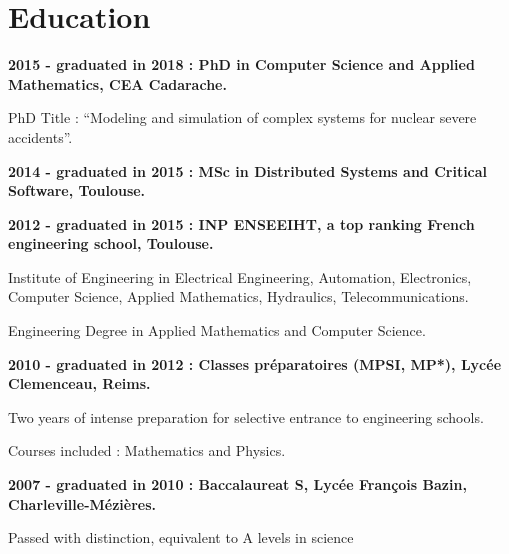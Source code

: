 \documentclass{article}
\renewenvironment{itemize}{
  \begin{list}{}{
      \setlength{\leftmargin}{1.5em}
      \setlength{\itemsep}{0.25em}
      \setlength{\parskip}{0pt}
      \setlength{\parsep}{0.25em}
    }
}{
  \end{list}
}
\begin{document}
\section*{Education}
\begin{itemize}
  	\item \textbf{2015 - graduated in 2018 : PhD in Computer Science and Applied Mathematics, CEA Cadarache.}
		\begin{itemize}
			\item PhD Title : ``Modeling and simulation of complex systems for nuclear severe accidents''.
		\end{itemize}
	\item \textbf{2014 - graduated in 2015 : MSc in Distributed Systems and Critical Software, Toulouse.}
    	\item \textbf{2012 - graduated in 2015 : INP ENSEEIHT, a top ranking French engineering school, Toulouse.}
		\begin{itemize}
			\item Institute of Engineering in Electrical Engineering, Automation, Electronics, Computer Science, Applied Mathematics, Hydraulics, Telecommunications.
			\item Engineering Degree in Applied Mathematics and Computer Science.
		\end{itemize}
	\item \textbf{2010 - graduated in 2012 : Classes préparatoires (MPSI, MP*), Lycée Clemenceau, Reims.}
		\begin{itemize}
			\item Two years of intense preparation for selective entrance to engineering schools.
			\item Courses included : Mathematics and Physics.
		\end{itemize}
	\item \textbf{2007 - graduated in 2010 : Baccalaureat S, Lycée François Bazin, Charleville-Mézières.}
		\begin{itemize}
			\item Passed with distinction, equivalent to A levels in science
		\end{itemize}
\end{itemize}
\end{document}
